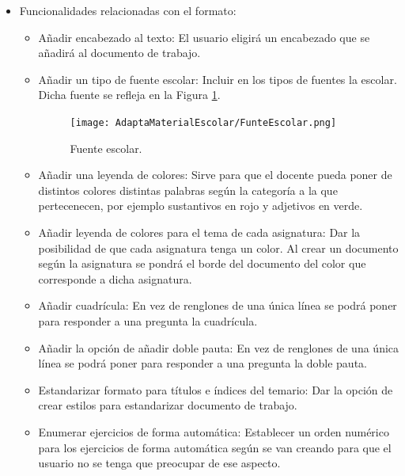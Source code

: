 \begin{itemize}
  \item Funcionalidades relacionadas con el formato:
        \begin{itemize}
          \item Añadir encabezado al texto: El usuario eligirá un encabezado que se añadirá al documento de trabajo.
          \item Añadir un tipo de fuente escolar: Incluir en los tipos de fuentes la escolar. Dicha fuente se refleja en la Figura \ref{escolar}.
                \begin{figure}[ht!]
                  \centering
                  \texttt{[image: AdaptaMaterialEscolar/FunteEscolar.png]}
                  \caption{Fuente escolar.}
                  \label{escolar}
                \end{figure}
          \item Añadir una leyenda de colores: Sirve para que el docente pueda poner de distintos colores distintas palabras según la categoría a la que pertecenecen, por ejemplo sustantivos en rojo y adjetivos en verde.
          \item Añadir leyenda de colores para el tema de cada asignatura: Dar la posibilidad de que cada asignatura tenga un color. Al crear un documento según la asignatura se pondrá el borde del documento del color que corresponde a dicha asignatura.
          \item Añadir cuadrícula: En vez de renglones de una única línea se podrá poner para responder a una pregunta la cuadrícula.
          \item Añadir la opción de añadir doble pauta: En vez de renglones de una única línea se podrá poner para responder a una pregunta la doble pauta.
          \item Estandarizar formato para títulos e índices del temario: Dar la opción de crear estilos para estandarizar documento de trabajo.
          \item Enumerar ejercicios de forma automática: Establecer un orden numérico para los ejercicios de forma automática según se van creando para que el usuario no se tenga que preocupar de ese aspecto.
        \end{itemize}


\end{itemize}
